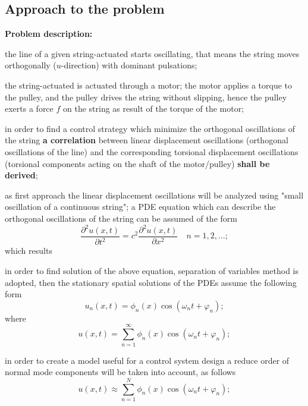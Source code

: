 \documentclass[12pt,a4paper]{scrartcl}
\begin{document}
\begin{onehalfspace}
\section{Approach to the problem}
\textbf{Problem description:}
\begin{myitemize_1}
	\item[--] the line of a given string-actuated starts oscillating, that means the string moves orthogonally ($u$-direction) with dominant pulsations;
	\item[--] the string-actuated is actuated through a motor; the motor applies a torque to the pulley, and the pulley drives the string without slipping, hence the pulley exerts a force $f$ on the string as result of the torque of the motor;
	\item[--] in order to find a control strategy which minimize the orthogonal oscillations of the string \textbf{a correlation} between linear displacement oscillations (orthogonal oscillations of the line) and the corresponding torsional displacement oscillations (torsional components acting on the shaft of the motor/pulley) \textbf{shall be derived};
	\item[--] as first approach the linear displacement oscillations will be analyzed using "small oscillation of a continuous string"; a PDE equation which can describe the orthogonal oscillations of the string can be assumed of the form
	\begin{equation}
		\frac{\partial^2 u(x,t)}{\partial t^2} = c^2\frac{\partial^2 u(x,t)}{\partial x^2}\quad n = 1,2,\dots;
	\end{equation}
	which results
	\item[--] in order to find solution of the above equation, separation of variables method is adopted, then the stationary spatial solutions of the PDEs assume the following form 
	\begin{equation}
		u_n(x,t) = \phi_n(x)\cos(\omega_n t + \varphi_n);
	\end{equation}
	where
	\begin{equation}
		u(x,t) = \sum_{n=1}^{\infty}\phi_n(x)\cos(\omega_n t + \varphi_n);
	\end{equation}
	\item[--] in order to create a model useful for a control system design a reduce order of normal mode components will be taken into account, as follows
	\begin{equation}
		u(x,t) \approx \sum_{n=1}^{N}\phi_n(x)\cos(\omega_n t + \varphi_n);
	\end{equation}

\end{myitemize_1}
\end{onehalfspace}
\end{document}

